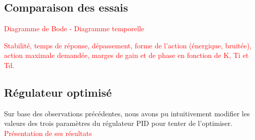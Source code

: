 \subsection{Comparaison des essais}
\textcolor{red}{Diagramme de Bode - Diagramme temporelle\\}

\textcolor{red}{Stabilité, temps de réponse, dépassement, forme de l’action (énergique, bruitée), action maximale demandée, marges de gain et de phase en fonction de K, Ti et Td.}

\subsection{Régulateur optimisé}
Sur base des observations précédentes, nous avons pu intuitivement modifier les valeurs des trois paramètres du régulateur PID pour tenter de l'optimiser.\\

\textcolor{red}{Présentation de ses résultats}

